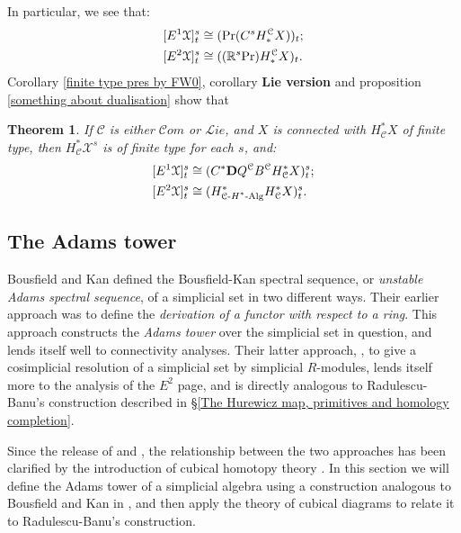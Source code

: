 \documentclass[11pt]{amsart}
\theoremstyle{plain}
\newtheorem{thm}{Theorem}[section]
\theoremstyle{definition}
\newcommand{\scrL}{\mathscr{L}}
\newcommand{\scrC}{\mathscr{C}}
\newcommand{\calX}{\mathcal{X}}
\newcommand{\calC}{\mathcal{C}}
\newcommand{\calc}{\mathcal{C}}
\theoremstyle{plain}
\newcommand{\HAlg}{\textup{-$H^*$-Alg}}
\newcommand{\algs}{{\scrC\!\textit{om}}}
\newcommand{\liealgs}{{\scrL\!\textit{ie}}}
\newcommand{\algcat}{{\calC}}%
\newcommand{\E}[5]{[E^{#1}_{#2}#3]^{#4}_{#5}}
\newcommand{\dual}{\mathbf{D}}
\begin{document}
\begin{BK spec seq}
In particular, we see that:
\begin{alignat*}{2}
\E{1}{}{\calX}{s}{t}&\cong (\textup{Pr}(C^sH_*^{\algcat}X))_{t};\\
\E{2}{}{\calX}{s}{t}&\cong((\mathbb{R}^s\textup{Pr})H_*^{\algcat}X)_t.
\end{alignat*}
Corollary \ref{finite type pres by FW0}, corollary \textbf{Lie version} and proposition \ref{something about dualisation} show that
\begin{thm}\label{identify E2 with derived Q}
If $\algcat$ is either $\algs$ or $\liealgs$, and $X$ is connected with $H^*_\calc X$  of finite type, then $H^*_\calc\calX^s$ is of finite type for each $s$, and:
\begin{alignat*}{2}
\E{1}{}{\calX}{s}{t}&\cong (C^*\dual Q^\algcat B^\algcat H^*_{\algcat}X)^{s}_{t};\\
\E{2}{}{\calX}{s}{t}&\cong (H^*_{\algcat\HAlg}H^*_{\algcat}X)^{s}_{t}.
\end{alignat*}
\end{thm}





\subsection{The Adams tower}\label{sec:derWRTab}\label{sec:relnWithRB}
Bousfield and Kan defined the Bousfield-Kan spectral sequence, or \emph{unstable Adams spectral sequence}, of a simplicial set in two different ways. Their earlier approach \cite{BK_pairings.pdf} was to define the \emph{derivation of a functor with respect to a ring}. This approach constructs the \emph{Adams tower} over the simplicial set in question, and lends itself well to connectivity analyses. Their latter approach, \cite{BousKanSSeq.pdf}, to give a cosimplicial resolution of a simplicial set by simplicial $R$-modules, lends itself more to the analysis of the $E^2$ page, and is directly analogous to Radulescu-Banu's construction described in \S\ref{The Hurewicz map, primitives and homology completion}.

Since the release of \cite{BK_pairings.pdf} and \cite{BousKanSSeq.pdf}, the relationship between the two approaches has been clarified by the introduction of cubical homotopy theory \cite{GoodwillieCalcII}. In this section we will define the Adams tower of a simplicial algebra using a construction analogous to Bousfield and Kan in \cite{BK_pairings.pdf}, and then apply the theory of cubical diagrams to relate it to Radulescu-Banu's construction. 



\end{BK spec seq}
\end{document}
